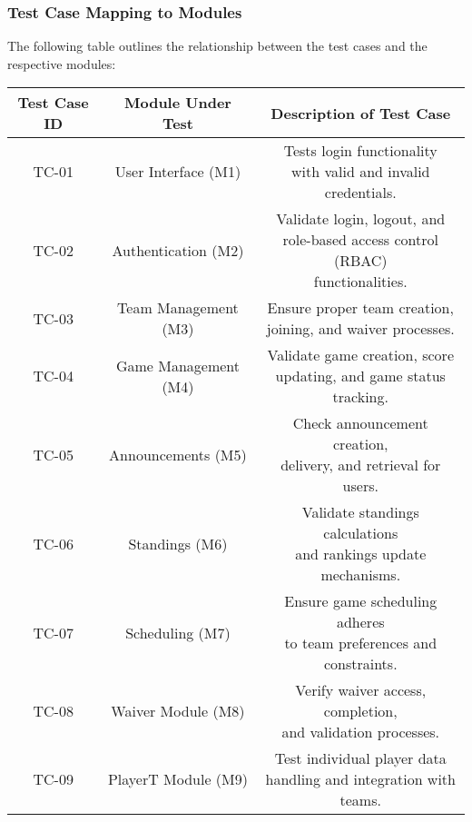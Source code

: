 \documentclass[12pt, titlepage]{article}
\begin{document}
\subsubsection*{Test Case Mapping to Modules}

The following table outlines the relationship between the test cases and the respective modules:

\begin{table}
	\centering
    \begin{tabular}{ |c|c|c| }
        \hline
        \textbf{Test Case ID} & \textbf{Module Under Test} & \textbf{Description of Test Case}           \\ \hline
        TC-01 & User Interface (M1) & \makecell{Tests login functionality \\ with valid and invalid credentials.} \\ \hline
        TC-02 & Authentication (M2) & \makecell{Validate login, logout, and \\role-based access control (RBAC)\\ functionalities.} \\ \hline
        TC-03 & Team Management (M3) & \makecell{Ensure proper team creation,\\ joining, and waiver processes.} \\ \hline
        TC-04 & Game Management (M4) & \makecell{Validate game creation, score\\ updating, and game status\\ tracking.} \\ \hline
        TC-05 & Announcements (M5) & \makecell{Check announcement creation,\\ delivery, and retrieval for users.} \\ \hline
        TC-06 & Standings (M6) & \makecell{Validate standings calculations\\ and rankings update mechanisms.} \\ \hline
        TC-07 & Scheduling (M7) & \makecell{Ensure game scheduling adheres\\ to team preferences and constraints.} \\ \hline
        TC-08 & Waiver Module (M8) & \makecell{Verify waiver access, completion,\\ and validation processes.} \\ \hline
        TC-09 & PlayerT Module (M9) & \makecell{Test individual player data\\ handling and integration with teams.} \\ \hline

\end{tabular}
\end{table}
\end{document}
